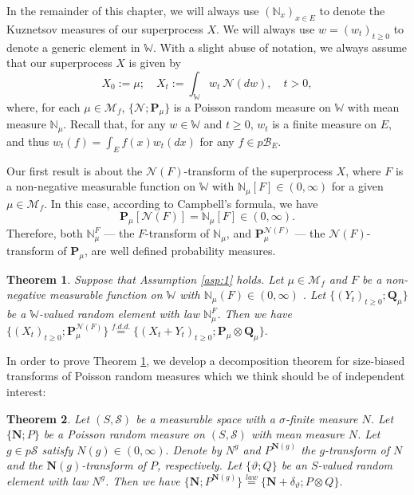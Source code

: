 \documentclass[UTF8]{pkuthss}
\theoremstyle{plain}
\newtheorem{thm}{Theorem}[section]
\theoremstyle{definition}
\numberwithin{equation}{section}
\begin{document}
In the remainder of this chapter, we will always use $(\mathbb N_x)_{x\in E}$ to denote the
Kuznetsov measures of our superprocess $X$.
We will always use $w = (w_t)_{t\geq 0}$ to denote a generic element in $\mathbb W$.
With a slight abuse of notation,
we always assume that our superprocess $X$ is given by
\[
	X_0 := \mu;
	\quad X_t
	:=\int_{\mathbb W}w_t~\mathcal N(dw),
	\quad t>0,
\]
	where, for each $\mu \in \mathcal M_f$, $\{\mathcal N; \mathbf P_\mu\}$ is a Poisson random measure on $\mathbb W$ with mean measure $\mathbb N_\mu$.
Recall that, for any $w\in \mathbb W$ and $t\geq 0$, $w_t$ is a finite measure on $E$, and thus $w_t(f)=\int_Ef(x)w_t(dx)$ for any $f \in p\mathscr B_E$.

Our first result is about the $\mathcal N(F)$-transform of the superprocess $X$, where $F$ is a non-negative measurable function on $\mathbb W$ with $\mathbb N_\mu[F] \in (0,\infty)$ for a given $\mu \in \mathcal M_f$. In this case, according to Campbell's formula, we have
\[
	\mathbf P_\mu[\mathcal N(F)]= \mathbb N_\mu[F] \in (0,\infty).
\]	
	Therefore, both $\mathbb N_\mu^F$ --- the $F$-transform of $\mathbb N_\mu$, and $\mathbf P_\mu^{\mathcal N(F)}$ --- the $\mathcal N(F)$-transform of $\mathbf P_\mu$, are well defined probability measures.
\begin{thm}\label{prop:sizBiasDecSupProc}
	Suppose that Assumption \ref{asp:1} holds.
Let $\mu \in \mathcal M_f$ and $F$ be a non-negative measurable function on $\mathbb W$ with $\mathbb N_\mu(F)\in (0,\infty)$ .
	Let $\{(Y_t)_{t\geq 0}; \mathbf Q_\mu\}$ be a $\mathbb W$-valued random element with
 law $\mathbb N^F_\mu$.
	Then we have
$
	\{(X_t)_{t\geq 0}; \mathbf P_\mu^{\mathcal N(F)}\}
	\overset{f.d.d.}{=} \{(X_t + Y_t)_{t\geq 0}; \mathbf P_\mu \otimes \mathbf Q_\mu\}.
$
\end{thm}
In order to prove Theorem \ref{prop:sizBiasDecSupProc},
	we develop a decomposition theorem for size-biased transforms of Poisson random measures which we think should be of independent interest:
\begin{thm}\label{prop:sizBaisPoissRandMeas}
	Let $(S, \mathscr S)$ be a measurable space with a $\sigma$-finite measure $N$.
	Let $\{\mathbf N; P\}$ be a Poisson random measure on $(S, \mathscr S)$
	with mean measure $N$.
	Let $g \in p \mathscr S$ satisfy $N(g)\in (0,\infty).$
	Denote by $N^g$ and $P^{\mathbf N(g)}$ the $g$-transform of $N$ and the $\mathbf N(g)$-transform of $P$, respectively.
	Let $\{\vartheta;Q\}$ be an $S$-valued random element
	with law $N^g$.
	Then we have
$
	\{\mathbf N;P^{\mathbf N(g)}\}
	\overset{law}{=} \{\mathbf N + \delta_\vartheta;P\otimes Q\}.
$
\end{thm}
\end{document}

